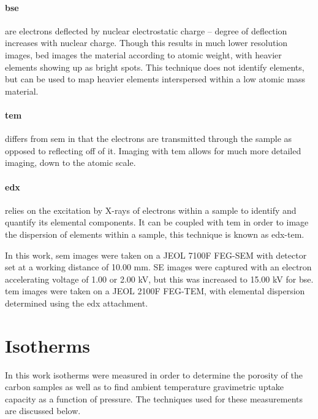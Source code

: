 \paragraph{\acrfull{bse}} are electrons deflected by nuclear electrostatic charge – degree of deflection increases with nuclear charge. Though this results in much lower resolution images, \acrfull{bed} images the material according to atomic weight, with heavier elements showing up as bright spots. This technique does not identify elements, but can be used to map heavier elements interspersed within a low atomic mass material.\citep{Goldstein2017Scanning}

\paragraph{\acrfull{tem}} differs from \acrshort{sem} in that the electrons are transmitted through the sample as opposed to reflecting off of it. Imaging with \acrshort{tem} allows for much more detailed imaging, down to the atomic scale.\citep{knoll1932elektronenmikroskop}

\paragraph{\acrfull{edx}} relies on the excitation by X-rays of electrons within a sample to identify and quantify its elemental components. It can be coupled with \acrshort{tem} in order to image the dispersion of elements within a sample, this technique is known as \acrshort{edx}-\acrshort{tem}.\citep{Goldstein2017Scanning}

In this work, \acrshort{sem} images were taken on a JEOL 7100F FEG-SEM with detector set at a working distance of 10.00 mm. SE images were captured with an electron accelerating voltage of 1.00 or 2.00 kV, but this was increased to 15.00 kV for \acrshort{bse}. \acrshort{tem} images were taken on a JEOL 2100F FEG-TEM, with elemental dispersion determined using the \acrshort{edx} attachment.

\section{Isotherms}\label{s:porosimetry}

In this work isotherms were measured in order to determine the porosity of the carbon samples as well as to find ambient temperature gravimetric  uptake capacity as a function of pressure. The techniques used for these measurements are discussed below.


